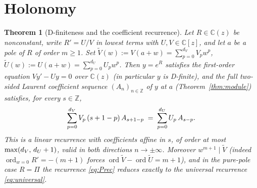 \documentclass{article}
\newcommand{\assign}{:=}
\newcommand{\tmop}[1]{\ensuremath{\operatorname{#1}}}
\newtheorem{theorem}{Theorem}
\newcommand{\ord}{\tmop{ord}}
\newcommand{\C}{\mathbb{C}}
\newcommand{\Z}{\mathbb{Z}}
\begin{document}
\section{Holonomy}\label{sec:holonomy}

\begin{theorem}
  [D-finiteness and the coefficient recurrence]\label{thm:holonomy} Let $R \in
  \C (z)$ be nonconstant, write $R' = U / V$ in lowest terms with $U, V \in \C
  [z]$, and let $a$ be a pole of $R$ of order $m \ge 1$. Set $\tilde{V} (w)
  \assign V (a + w) = \sum_{p = 0}^{d_V} V_p w^p$, $\tilde{U} (w) \assign U (a
  + w) = \sum_{p = 0}^{d_U} U_p w^p$. Then $y = e^R$ satisfies the first-order
  equation $Vy' - Uy = 0$ over $\C (z)$ (in particular $y$ is D-finite), and
  the full two-sided Laurent coefficient sequence $(A_n)_{n \in \Z}$ of $y$ at
  $a$ (Theorem~\ref{thm:module}) satisfies, for every $s \in \Z$,
  \begin{equation}
    \label{eq:Prec} \sum_{p = 0}^{d_V} V_p  \hspace{0.17em} (s + 1 - p) 
    \hspace{0.17em} A_{s + 1 - p} \hspace{0.27em} = \hspace{0.27em} \sum_{p =
    0}^{d_U} U_p  \hspace{0.17em} A_{s - p} .
  \end{equation}
  This is a linear recurrence with coefficients affine in $s$, of order at
  most $\max (d_V, \hspace{0.17em} d_U + 1)$, valid in both directions $n \to
  \pm \infty$. Moreover $w^{m + 1} \mid \tilde{V}$ (indeed $\ord_{w = 0} R' =
  - (m + 1)$ forces $\ord \tilde{V} - \ord \tilde{U} = m + 1$), and in the
  pure-pole case $R = \Pi$ the recurrence \eqref{eq:Prec} reduces exactly to
  the universal recurrence \eqref{eq:universal}.
\end{theorem}
\end{document}
